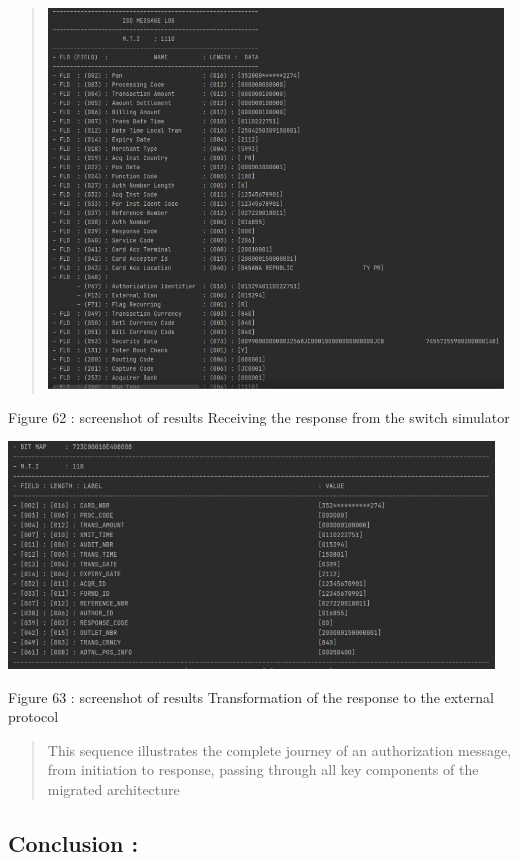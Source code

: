 \documentclass[12pt,a4paper]{report}
\begin{document}
\begin{quote}
\includegraphics[width=4.75096in,height=3.97089in]{vertopal_d1b0b2209edd4c6aa8254f57daa0953b/media/image81.jpeg}
\end{quote}

\protect\hypertarget{_Toc201954538}{}{}Figure 62 : screenshot of results
Receiving the response from the switch simulator

\includegraphics[width=5.06875in,height=2.37083in]{vertopal_d1b0b2209edd4c6aa8254f57daa0953b/media/image82.jpeg}

\protect\hypertarget{_Toc201954539}{}{}Figure 63 : screenshot of results
Transformation of the response to the external protocol

\begin{quote}
This sequence illustrates the complete journey of an authorization
message, from initiation to response, passing through all key components
of the migrated architecture
\end{quote}

\hypertarget{conclusion-3}{%
\subsection{\texorpdfstring{\textbf{Conclusion
:}}{Conclusion :}}\label{conclusion-3}}
\end{document}
